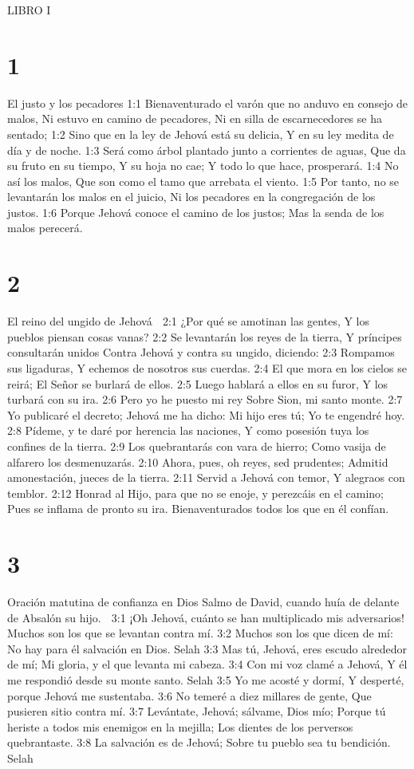 

LIBRO I

\chapter{1}

El justo y los pecadores 
1:1 Bienaventurado el varón que no anduvo en consejo de malos, 
Ni estuvo en camino de pecadores, 
Ni en silla de escarnecedores se ha sentado; 
1:2 Sino que en la ley de Jehová está su delicia, 
Y en su ley medita de día y de noche. 
1:3 Será como árbol plantado junto a corrientes de aguas, 
Que da su fruto en su tiempo, 
Y su hoja no cae; 
Y todo lo que hace, prosperará. 
1:4 No así los malos, 
Que son como el tamo que arrebata el viento. 
1:5 Por tanto, no se levantarán los malos en el juicio, 
Ni los pecadores en la congregación de los justos. 
1:6 Porque Jehová conoce el camino de los justos; 
Mas la senda de los malos perecerá. 

\chapter{2}

El reino del ungido de Jehová 

2:1 ¿Por qué se amotinan las gentes, 
Y los pueblos piensan cosas vanas? 
2:2 Se levantarán los reyes de la tierra, 
Y príncipes consultarán unidos 
Contra Jehová y contra su ungido, diciendo: 
2:3 Rompamos sus ligaduras, 
Y echemos de nosotros sus cuerdas. 
2:4 El que mora en los cielos se reirá; 
El Señor se burlará de ellos. 
2:5 Luego hablará a ellos en su furor, 
Y los turbará con su ira. 
2:6 Pero yo he puesto mi rey 
Sobre Sion, mi santo monte. 
2:7 Yo publicaré el decreto; 
Jehová me ha dicho: Mi hijo eres tú; 
Yo te engendré hoy. 
2:8 Pídeme, y te daré por herencia las naciones, 
Y como posesión tuya los confines de la tierra. 
2:9 Los quebrantarás con vara de hierro; 
Como vasija de alfarero los desmenuzarás. 
2:10 Ahora, pues, oh reyes, sed prudentes; 
Admitid amonestación, jueces de la tierra. 
2:11 Servid a Jehová con temor, 
Y alegraos con temblor. 
2:12 Honrad al Hijo, para que no se enoje, y perezcáis en el camino; 
Pues se inflama de pronto su ira. 
Bienaventurados todos los que en él confían. 

\chapter{3}

Oración matutina de confianza en Dios 
Salmo de David, cuando huía de delante de Absalón su hijo. 

3:1 ¡Oh Jehová, cuánto se han multiplicado mis adversarios! 
Muchos son los que se levantan contra mí. 
3:2 Muchos son los que dicen de mí: 
No hay para él salvación en Dios. Selah 
3:3 Mas tú, Jehová, eres escudo alrededor de mí; 
Mi gloria, y el que levanta mi cabeza. 
3:4 Con mi voz clamé a Jehová, 
Y él me respondió desde su monte santo. Selah 
3:5 Yo me acosté y dormí, 
Y desperté, porque Jehová me sustentaba. 
3:6 No temeré a diez millares de gente, 
Que pusieren sitio contra mí. 
3:7 Levántate, Jehová; sálvame, Dios mío; 
Porque tú heriste a todos mis enemigos en la mejilla; 
Los dientes de los perversos quebrantaste. 
3:8 La salvación es de Jehová; 
Sobre tu pueblo sea tu bendición. Selah 

